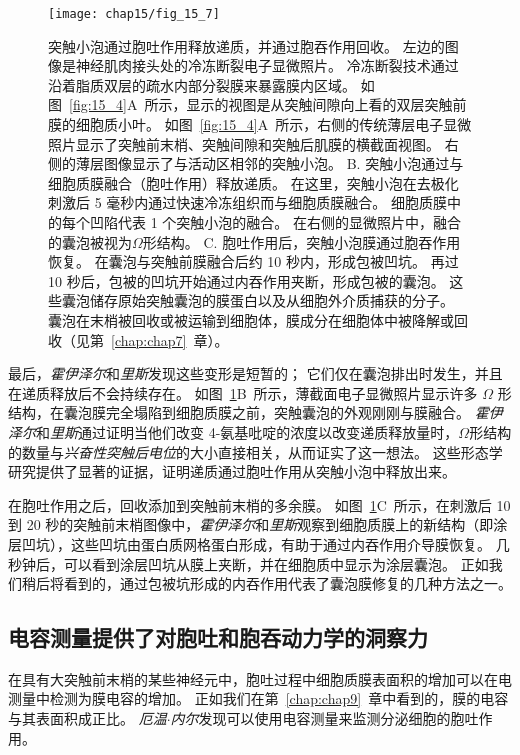 \begin{figure}[htbp]
	\centering
	\texttt{[image: chap15/fig\_15\_7]}
	\caption{突触小泡通过胞吐作用释放递质，并通过胞吞作用回收。
		左边的图像是神经肌肉接头处的冷冻断裂电子显微照片。
		冷冻断裂技术通过沿着脂质双层的疏水内部分裂膜来暴露膜内区域。
		如图~\ref{fig:15_4}A~所示，显示的视图是从突触间隙向上看的双层突触前膜的细胞质小叶。
		如图~\ref{fig:15_4}A~所示，右侧的传统薄层电子显微照片显示了突触前末梢、突触间隙和突触后肌膜的横截面视图\cite{heuser1981structural}。
		右侧的薄层图像显示了与活动区相邻的突触小泡。
		B. 突触小泡通过与细胞质膜融合（胞吐作用）释放递质。
		在这里，突触小泡在去极化刺激后 5 毫秒内通过快速冷冻组织而与细胞质膜融合。
		细胞质膜中的每个凹陷代表 1 个突触小泡的融合。
		在右侧的显微照片中，融合的囊泡被视为$\Omega$形结构。
		C. 胞吐作用后，突触小泡膜通过胞吞作用恢复。
		在囊泡与突触前膜融合后约 10 秒内，形成包被凹坑。
		再过 10 秒后，包被的凹坑开始通过内吞作用夹断，形成包被的囊泡。
		这些囊泡储存原始突触囊泡的膜蛋白以及从细胞外介质捕获的分子。
		囊泡在末梢被回收或被运输到细胞体，膜成分在细胞体中被降解或回收（见第~\ref{chap:chap7}~章）。}
	\label{fig:15_7}
\end{figure}



最后，\textit{霍伊泽尔}和\textit{里斯}发现这些变形是短暂的；
它们仅在囊泡排出时发生，并且在递质释放后不会持续存在。
如图~\ref{fig:15_7}B~所示，薄截面电子显微照片显示许多 $\Omega$ 形结构，在囊泡膜完全塌陷到细胞质膜之前，突触囊泡的外观刚刚与膜融合。
\textit{霍伊泽尔}和\textit{里斯}通过证明当他们改变 4-氨基吡啶的浓度以改变递质释放量时，$\Omega$形结构的数量与\textit{兴奋性突触后电位}的大小直接相关，从而证实了这一想法。
这些形态学研究提供了显著的证据，证明递质通过胞吐作用从突触小泡中释放出来。


在胞吐作用之后，回收添加到突触前末梢的多余膜。
如图~\ref{fig:15_7}C~所示，在刺激后 10 到 20 秒的突触前末梢图像中，\textit{霍伊泽尔}和\textit{里斯}观察到细胞质膜上的新结构（即涂层凹坑），这些凹坑由蛋白质网格蛋白形成，有助于通过内吞作用介导膜恢复。
几秒钟后，可以看到涂层凹坑从膜上夹断，并在细胞质中显示为涂层囊泡。
正如我们稍后将看到的，通过包被坑形成的内吞作用代表了囊泡膜修复的几种方法之一。



\subsection{电容测量提供了对胞吐和胞吞动力学的洞察力}

在具有大突触前末梢的某些神经元中，胞吐过程中细胞质膜表面积的增加可以在电测量中检测为膜电容的增加。
正如我们在第~\ref{chap:chap9}~章中看到的，膜的电容与其表面积成正比。
\textit{厄温$\cdot$内尔}发现可以使用电容测量来监测分泌细胞的胞吐作用。


